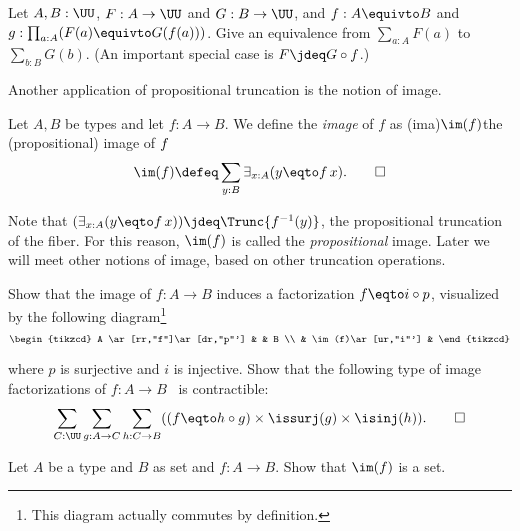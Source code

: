 \begin{xca}\label{xca:sum-equivalences}
Let $A,B:\UU$, $F:A\to\UU$ and $G:B\to\UU$,
and $f: A\equivto B$ and $g:\prod_{a:A}(F(a) \equivto G(f(a)))$.
Give an equivalence from $\sum_{a:A} F(a)$ to $\sum_{b:B} G(b)$.
(An important special case is $F\jdeq G\circ f$.)
\end{xca}

Another application of propositional truncation
is the notion of image.
\begin{definition}\label{def:prop-image}
  Let $A,B$ be types and let $f : A \to B$. We define the \emph{image} of $f$ as
  \glossary(ima){$\protect\im(f)$}{the (propositional) image of $\protect f$}
  \[
    \im(f) \defeq \sum_{y:B}\exists_{x:A}(y \eqto f\,x).\qedhere
  \]
\end{definition}

Note that $(\exists_{x:A}(y \eqto f\,x)) \jdeq \Trunc{f^{-1}(y)}$,
the propositional truncation of the fiber.
For this reason, $\im(f)$ is called the \emph{propositional} image.
Later we will meet other notions of image, based on other truncation operations.

\begin{xca}\label{xca:unique-fact-image}
  Show that the image of $f : A \to B$ induces a factorization
  $f \eqto i\circ p$, visualized by the following diagram\footnote{%
  This diagram actually commutes by definition.}
  \[
    \begin{tikzcd}
      A \ar[rr,"f"]\ar[dr,"p"'] & & B \\
      & \im(f)\ar[ur,"i"'] &
    \end{tikzcd}
  \]

  where $p$ is surjective and $i$ is injective. Show that the
  following type of image factorizations of $f : A \to B$~ 
  is contractible:
  \[
  \sum_{C:\UU}\sum_{g:A\to C}\sum_{h: C\to B}
  ((f \eqto h\circ g) \times \issurj(g) \times \isinj(h)).\qedhere
  \]
\end{xca}

\begin{xca}\label{xca:prop-image-is-set}
Let $A$ be a type and $B$ as set and $f:A\to B$.
Show that $\im(f)$ is a set.
\end{xca}

